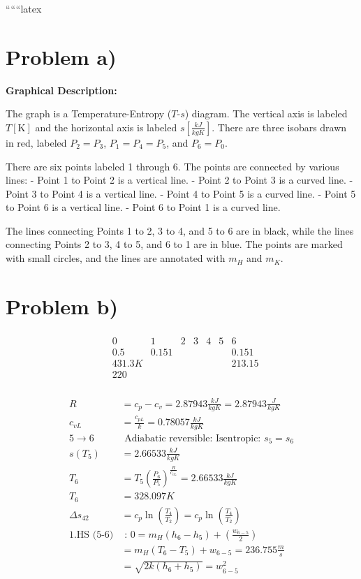 
``````latex


\section*{Problem a)}

\begin{center}
\textbf{Graphical Description:}
\end{center}

The graph is a Temperature-Entropy ($T$-$s$) diagram. The vertical axis is labeled $T [\text{K}]$ and the horizontal axis is labeled $s [\frac{kJ}{kgK}]$. There are three isobars drawn in red, labeled $P_2 = P_3$, $P_1 = P_4 = P_5$, and $P_6 = P_0$. 

There are six points labeled 1 through 6. The points are connected by various lines:
- Point 1 to Point 2 is a vertical line.
- Point 2 to Point 3 is a curved line.
- Point 3 to Point 4 is a vertical line.
- Point 4 to Point 5 is a curved line.
- Point 5 to Point 6 is a vertical line.
- Point 6 to Point 1 is a curved line.

The lines connecting Points 1 to 2, 3 to 4, and 5 to 6 are in black, while the lines connecting Points 2 to 3, 4 to 5, and 6 to 1 are in blue. The points are marked with small circles, and the lines are annotated with $m_H$ and $m_K$.

\section*{Problem b)}

\begin{align*}
&\begin{array}{c|c|c|c|c|c|c}
0 & 1 & 2 & 3 & 4 & 5 & 6 \\
\hline
0.5 & 0.151 & & & & & 0.151 \\
431.3K & & & & & & 213.15 \\
220 & & & & & & \\
\end{array}
\end{align*}

\begin{align*}
R &= c_p - c_v = 2.87943 \frac{kJ}{kgK} = 2.87943 \frac{J}{kgK} \\
c_{vL} &= \frac{c_{pL}}{k} = 0.78057 \frac{kJ}{kgK} \\
5 \rightarrow 6 &\text{ Adiabatic reversible: Isentropic: } s_5 = s_6 \\
s(T_5) &= 2.66533 \frac{kJ}{kgK} \\
T_6 &= T_5 \left(\frac{P_6}{P_5}\right)^{\frac{R}{c_{vL}}} = 2.66533 \frac{kJ}{kgK} \\
T_6 &= 328.097 K \\
\Delta s_{42} &= c_p \ln \left(\frac{T_4}{T_2}\right) = c_p \ln \left(\frac{T_4}{T_2}\right) \\
1. \text{HS (5-6)} &\text{ : } 0 = m_H (h_6 - h_5) + \left(\frac{w_{6-5}}{2}\right) \\
&= m_H (T_6 - T_5) + w_{6-5} = 236.755 \frac{m}{s} \\
&= \sqrt{2k(h_6 + h_5)} = w_{6-5}^2
\end{align*}

